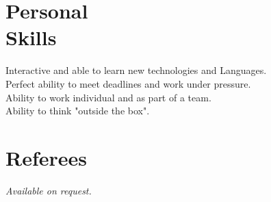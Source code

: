 \documentclass[margin,line,a4paper]{resume}
\begin{document}
\begin{resume}
\section{\mysidestyle Personal\\Skills}
	Interactive and able to learn new technologies and Languages.\\
	Perfect ability to meet deadlines and work under pressure.\\
	Ability to work individual and as part of a team.\\
	Ability to think "outside the box".

    \section{\mysidestyle Referees} 
    {\sl Available on request.}

\end{resume}
\end{document}
